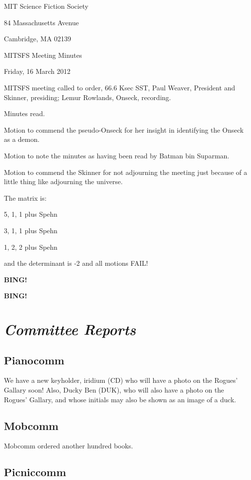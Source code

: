 \documentclass[10pt]{article}
\newcommand{\bing}{{\bf BING!} }
\newcommand{\goto}[1]{\bing \vskip 12pt \section*{{\em{#1}}}}
\newcommand{\ps}{ plus Spehn\xspace}
\newcommand{\skinner}{Paul Weaver, President and Skinner}
\newcommand{\onseck}{Lemur Rowlands, Onseck}
\newcommand{\meetingdate}{Friday, 16 March 2012}
\begin{document}
\begin{center}

MIT Science Fiction Society

84 Massachusetts Avenue

Cambridge, MA 02139

\vspace{12pt}

MITSFS Meeting Minutes

\meetingdate

\end{center}

\vspace{18pt}

\setlength{\parskip}{6pt}

\noindent
MITSFS meeting called to order, 66.6 Ksec SST,
\skinner, presiding; \onseck, recording.

Minutes read.

Motion to commend the pseudo-Onseck for her insight in identifying the
Onseck as a demon.

Motion to note the minutes as having been read by Batman bin Suparman.

Motion to commend the Skinner for not adjourning the meeting just because
of a little thing like adjourning the universe.

The matrix is:

5, 1, 1 \ps

3, 1, 1 \ps

1, 2, 2 \ps

and the determinant is -2 and all motions FAIL!


\bing

\goto{Committee Reports}

\subsection*{Pianocomm}

We have a new keyholder, iridium (CD) who will have a photo on the Rogues'
Gallary soon!  Also, Ducky Ben (DUK), who will also have a photo on the Rogues'
Gallary, and whose initials may also be shown as an image of a duck.

\subsection*{Mobcomm}

Mobcomm ordered another hundred books.

\subsection*{Picniccomm}
\end{document}
